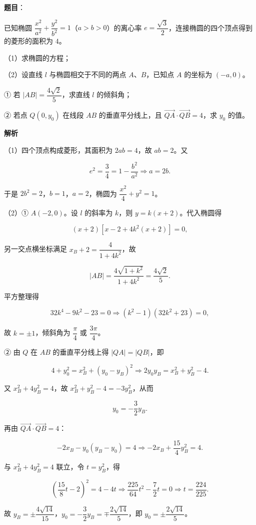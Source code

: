 \begin{answer}

\textbf{题目}：

已知椭圆 $\dfrac{x^2}{a^2}+\dfrac{y^2}{b^2}=1$（$a>b>0$）的离心率 $e=\dfrac{\sqrt3}2$，连接椭圆的四个顶点得到的菱形的面积为 $4$。

（1）求椭圆的方程；

（2）设直线 $l$ 与椭圆相交于不同的两点 $A$、$B$，已知点 $A$ 的坐标为 $(-a,0)$。

① 若 $|AB|=\dfrac{4\sqrt2}5$，求直线 $l$ 的倾斜角；

② 若点 $Q(0,y_0)$ 在线段 $AB$ 的垂直平分线上，且 $\overrightarrow{QA}\cdot\overrightarrow{QB}=4$，求 $y_0$ 的值。

\textbf{解析}

（1）四个顶点构成菱形，其面积为 $2ab=4$，故 $ab=2$。又

\nopagebreak[4]
\[e^2=\frac34=1-\frac{b^2}{a^2}\Longrightarrow a=2b.\]

于是 $2b^2=2$，$b=1$，$a=2$，椭圆为 $\dfrac{x^2}4+y^2=1$。

（2）① $A(-2,0)$。设 $l$ 的斜率为 $k$，则 $y=k(x+2)$。代入椭圆得

\nopagebreak[4]
\[(x+2)\left[x-2+4k^2(x+2)\right]=0,\]

另一交点横坐标满足 $x_B+2=\dfrac4{1+4k^2}$，故

\nopagebreak[4]
\[|AB|=\frac{4\sqrt{1+k^2}}{1+4k^2}=\frac{4\sqrt2}5.\]

平方整理得

\nopagebreak[4]
\[32k^4-9k^2-23=0\Longrightarrow(k^2-1)(32k^2+23)=0,\]

故 $k=\pm1$，倾斜角为 $\dfrac\pi4$ 或 $\dfrac{3\pi}4$。

② 由 $Q$ 在 $AB$ 的垂直平分线上得 $|QA|=|QB|$，即

\nopagebreak[4]
\[4+y_0^2=x_B^2+(y_0-y_B)^2
\Longrightarrow 2y_0y_B=x_B^2+y_B^2-4.\]

又 $x_B^2+4y_B^2=4$，故 $x_B^2+y_B^2-4=-3y_B^2$，从而

\nopagebreak[4]
\[y_0=-\frac32y_B.\]

再由 $\overrightarrow{QA}\cdot\overrightarrow{QB}=4$：

\nopagebreak[4]
\[-2x_B-y_0(y_B-y_0)=4
\Longrightarrow -2x_B+\frac{15}4y_B^2=4.\]

与 $x_B^2+4y_B^2=4$ 联立，令 $t=y_B^2$，得

\nopagebreak[4]
\[\left(\frac{15}8t-2\right)^2=4-4t
\Longrightarrow \frac{225}{64}t^2-\frac72t=0
\Longrightarrow t=\frac{224}{225}.\]

故 $y_B=\pm\dfrac{4\sqrt{14}}{15}$，$y_0=-\dfrac32y_B=\mp\dfrac{2\sqrt{14}}5$，即 $y_0=\pm\dfrac{2\sqrt{14}}5$。


\end{answer}
